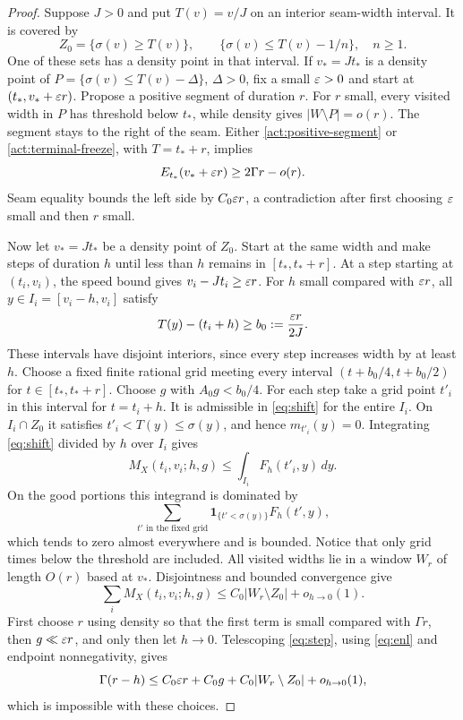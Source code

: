 \begin{proof}
Suppose $J>0$ and put $T(v)=v/J$ on an interior seam-width interval.
It is covered by
\[
 Z_0=\{\sigma(v)\ge T(v)\},\qquad
 \{\sigma(v)\le T(v)-1/n\},\quad n\ge1.
\]
One of these sets has a density point in that interval.
If $v_*=Jt_*$ is a density point of
$P=\{\sigma(v)\le T(v)-\Delta\}$, $\Delta>0$, fix a small
$\varepsilon>0$ and start at $(t_*,v_*+\varepsilon r)$.  Propose a positive
segment of duration $r$.  For $r$ small, every visited width in
$P$ has threshold below $t_*$, while density gives
$|W\setminus P|=o(r)$.  The segment stays to the right of the
seam.  Either \eqref{act:positive-segment} or
\eqref{act:terminal-freeze}, with $T=t_*+r$, implies
\[
 E_{t_*}(v_*+\varepsilon r)\ge2\Gamma r-o(r).
\]
Seam equality bounds the left side by $C_0\varepsilon r$, a contradiction
after first choosing $\varepsilon$ small and then $r$ small.

Now let $v_*=Jt_*$ be a density point of $Z_0$.  Start at the same
width and make steps of duration $h$ until less than $h$ remains
in $[t_*,t_*+r]$.  At a step starting at $(t_i,v_i)$, the speed
bound gives $v_i-Jt_i\ge\varepsilon r$.  For $h$ small compared with
$\varepsilon r$, all $y\in I_i=[v_i-h,v_i]$ satisfy
\[
 T(y)-(t_i+h)\ge b_0:=\frac{\varepsilon r}{2J}.
\]
These intervals have disjoint interiors, since every step
increases width by at least $h$.
Choose a fixed finite rational grid meeting every interval
$(t+b_0/4,t+b_0/2)$ for $t\in[t_*,t_*+r]$.  Choose $g$ with
$A_0g<b_0/4$.  For each step take a grid point $t'_i$ in this
interval for $t=t_i+h$.  It is admissible in \eqref{eq:shift}
for the entire $I_i$.  On $I_i\cap Z_0$ it satisfies
$t'_i<T(y)\le\sigma(y)$, and hence $m_{t'_i}(y)=0$.
Integrating \eqref{eq:shift} divided by $h$ over $I_i$ gives
\[
 M_X(t_i,v_i;h,g)\le\int_{I_i}F_h(t'_i,y)\,dy.
\]
On the good portions this integrand is dominated by
\[
 \sum_{t'\text{ in the fixed grid}}
       \mathbf1_{\{t'<\sigma(y)\}}F_h(t',y),
\]
which tends to zero almost everywhere and is bounded.  Notice
that only grid times below the threshold are included.
All visited widths lie in a window $W_r$ of length $O(r)$ based
at $v_*$.  Disjointness and bounded convergence give
\[
 \sum_i M_X(t_i,v_i;h,g)
 \le C_0|W_r\setminus Z_0|+o_{h\to0}(1).
\]
First choose $r$ using density so that the first term is small
compared with $\Gamma r$, then $g\ll\varepsilon r$, and only then
let $h\to0$.  Telescoping \eqref{eq:step}, using
\eqref{eq:enl} and endpoint nonnegativity, gives
\[
 \Gamma(r-h)\le C_0\varepsilon r+C_0g
                  +C_0|W_r\setminus Z_0|+o_{h\to0}(1),
\]
which is impossible with these choices.


\end{proof}
